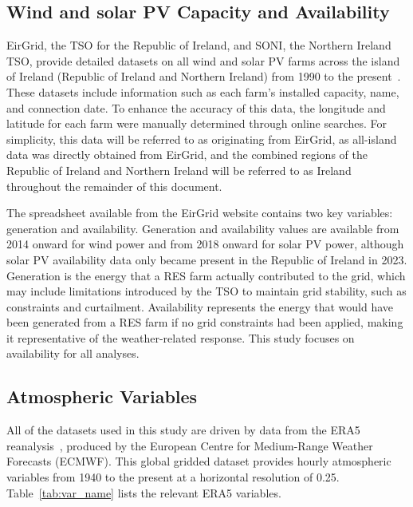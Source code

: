 \documentclass[preprint, 12pt]{elsarticle}
\begin{document}
\subsection{Wind and solar PV Capacity and Availability}
\label{sec:eirgrid}

EirGrid, the TSO for the Republic of Ireland, and SONI, the Northern Ireland TSO, provide detailed datasets on all wind and solar PV farms across the island of Ireland (Republic of Ireland and Northern Ireland) from 1990 to the present~\citep{eirgrid2023spreadsheet}. These datasets include information such as each farm’s installed capacity, name, and connection date. To enhance the accuracy of this data, the longitude and latitude for each farm were manually determined through online searches. For simplicity, this data will be referred to as originating from EirGrid, as all-island data was directly obtained from EirGrid, and the combined regions of the Republic of Ireland and Northern Ireland will be referred to as Ireland throughout the remainder of this document.

The spreadsheet available from the EirGrid website contains two key variables: generation and availability. Generation and availability values are available from 2014 onward for wind power and from 2018 onward for solar PV power, although solar PV availability data only became present in the Republic of Ireland in 2023. Generation is the energy that a RES farm actually contributed to the grid, which may include limitations introduced by the TSO to maintain grid stability, such as constraints and curtailment. Availability represents the energy that would have been generated from a RES farm if no grid constraints had been applied, making it representative of the weather-related response. This study focuses on availability for all analyses.

\subsection{Atmospheric Variables}
\label{sec:era5}

All of the datasets used in this study are driven by data from the ERA5 reanalysis~\citep{hersbach2020era5}, produced by the European Centre for Medium-Range Weather Forecasts (ECMWF). This global gridded dataset provides hourly atmospheric variables from 1940 to the present at a horizontal resolution of 0.25\textdegree. Table~\ref{tab:var_name} lists the relevant ERA5 variables.
\end{document}
